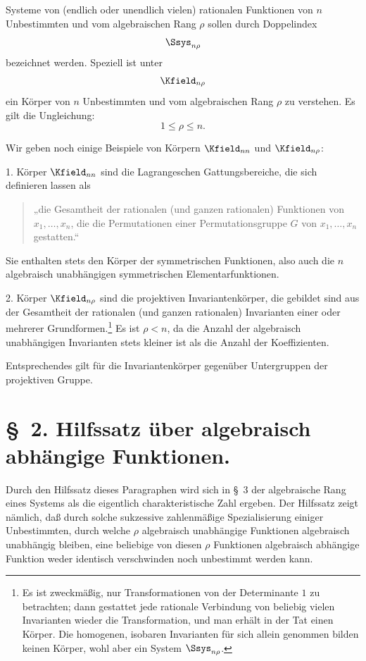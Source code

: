 \documentclass[11pt]{article}
\begin{document}
Systeme von (endlich oder unendlich vielen) rationalen Funktionen von $n$ Unbestimmten und vom algebraischen Rang $\rho$ sollen durch Doppelindex
\[
  \Ssys_{n\rho}
\]
bezeichnet werden. Speziell ist unter
\[
  \Kfield_{n\rho}
\]
ein Körper von $n$ Unbestimmten und vom algebraischen Rang $\rho$ zu verstehen. Es gilt die Ungleichung:
\[
  1\leq \rho\leq n.
\]

Wir geben noch einige Beispiele von Körpern $\Kfield_{nn}$ und $\Kfield_{n\rho}$:

1. Körper $\Kfield_{nn}$ sind die Lagrangeschen Gattungsbereiche, die sich definieren lassen als
\begin{quote}
„die Gesamtheit der rationalen (und ganzen rationalen) Funktionen von $x_1,\ldots,x_n$, die die Permutationen einer Permutationsgruppe $G$ von $x_1,\ldots,x_n$ gestatten.“
\end{quote}
Sie enthalten stets den Körper der symmetrischen Funktionen, also auch die $n$ algebraisch unabhängigen symmetrischen Elementarfunktionen.

2. Körper $\Kfield_{n\rho}$ sind die projektiven Invariantenkörper, die gebildet sind aus der Gesamtheit der rationalen (und ganzen rationalen) Invarianten einer oder mehrerer Grundformen.\footnote{Es ist zweckmäßig, nur Transformationen von der Determinante $1$ zu betrachten; dann gestattet jede rationale Verbindung von beliebig vielen Invarianten wieder die Transformation, und man erhält in der Tat einen Körper. Die homogenen, isobaren Invarianten für sich allein genommen bilden keinen Körper, wohl aber ein System $\Ssys_{n\rho}$.} Es ist $\rho<n$, da die Anzahl der algebraisch unabhängigen Invarianten stets kleiner ist als die Anzahl der Koeffizienten.

Entsprechendes gilt für die Invariantenkörper gegenüber Untergruppen der projektiven Gruppe.

\section*{\S\ 2. Hilfssatz über algebraisch abhängige Funktionen.}

Durch den Hilfssatz dieses Paragraphen wird sich in \S\ 3 der algebraische Rang eines Systems als die eigentlich charakteristische Zahl ergeben. Der Hilfssatz zeigt nämlich, daß durch solche sukzessive zahlenmäßige Spezialisierung einiger Unbestimmten, durch welche $\rho$ algebraisch unabhängige Funktionen algebraisch unabhängig bleiben, eine beliebige von diesen $\rho$ Funktionen algebraisch abhängige Funktion weder identisch verschwinden noch unbestimmt werden kann.
\end{document}
